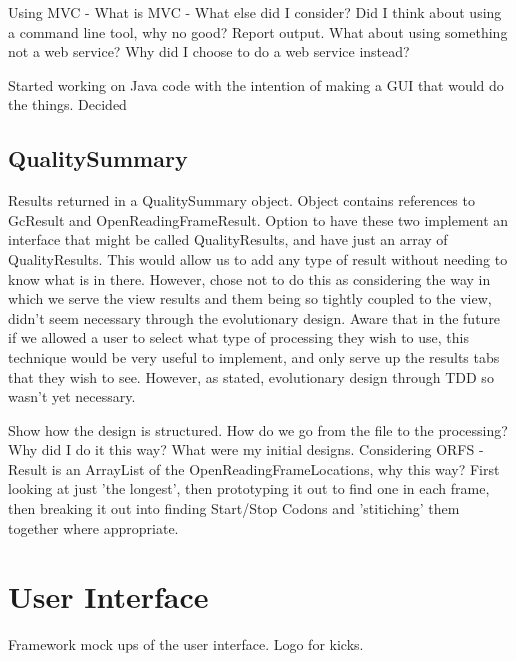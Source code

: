 Using MVC - What is MVC - What else did I consider? Did I think about using a command line tool, why no good? Report output. What about using something not a web service? Why did I choose to do a web service instead?

Started working on Java code with the intention of making a GUI that would do the things. Decided


\subsection{QualitySummary}
Results returned in a QualitySummary object. Object contains references to GcResult and OpenReadingFrameResult. Option to have these two implement an interface that might be called QualityResults, and have just an array of QualityResults. This would allow us to add any type of result without needing to know what is in there. However, chose not to do this as considering the way in which we serve the view results and them being so tightly coupled to the view, didn't seem necessary through the evolutionary design. Aware that in the future if we allowed a user to select what type of processing they wish to use, this technique would be very useful to implement, and only serve up the results tabs that they wish to see. However, as stated, evolutionary design through TDD so wasn't yet necessary.

Show how the design is structured. How do we go from the file to the processing? Why did I do it this way? What were my initial designs.
Considering ORFS - Result is an ArrayList of the OpenReadingFrameLocations, why this way? First looking at just 'the longest', then prototyping it out to find one in each frame, then breaking it out into finding Start/Stop Codons and 'stitiching' them together where appropriate.

\section{User Interface}
Framework mock ups of the user interface. Logo for kicks.

